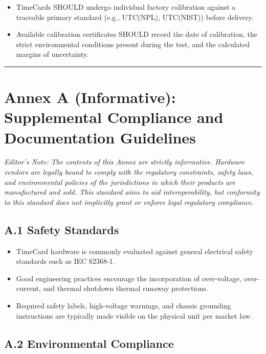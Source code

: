 \documentclass[
]{article}
\begin{document}
\begin{itemize}
\item
  TimeCards SHOULD undergo individual factory calibration against a
  traceable primary standard (e.g., UTC(NPL), UTC(NIST)) before
  delivery.\\
\item
  Available calibration certificates SHOULD record the date of
  calibration, the strict environmental conditions present during the
  test, and the calculated margins of uncertainty.
\end{itemize}

\begin{center}\rule{0.5\linewidth}{0.5pt}\end{center}

\section{Annex A (Informative): Supplemental Compliance and
Documentation
Guidelines}\label{annex-a-informative-supplemental-compliance-and-documentation-guidelines}

\emph{Editor's Note: The contents of this Annex are strictly
informative. Hardware vendors are legally bound to comply with the
regulatory constraints, safety laws, and environmental policies of the
jurisdictions in which their products are manufactured and sold. This
standard aims to aid interoperability, but conformity to this standard
does not implicitly grant or enforce legal regulatory compliance.}

\subsection{A.1 Safety Standards}\label{a.1-safety-standards}

\begin{itemize}
\item
  TimeCard hardware is commonly evaluated against general electrical
  safety standards such as IEC 62368-1.
\item
  Good engineering practices encourage the incorporation of
  over-voltage, over-current, and thermal shutdown thermal runaway
  protections.
\item
  Required safety labels, high-voltage warnings, and chassis grounding
  instructions are typically made visible on the physical unit per
  market law.
\end{itemize}

\subsection{A.2 Environmental
Compliance}\label{a.2-environmental-compliance}
\end{document}
